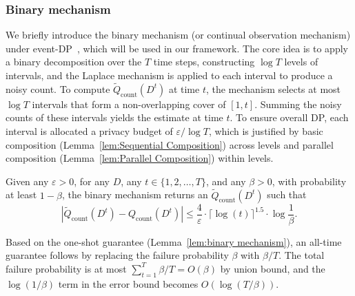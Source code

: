 \subsubsection{Binary mechanism}
\label{sec:Binary mechanism}
We briefly introduce the binary mechanism (or continual observation mechanism) under event-DP~\cite{dwork2010differential, chan2011private}, which will be used in our framework. 
The core idea is to apply a binary decomposition over the $T$ time steps, constructing $\log T$ levels of intervals, and the Laplace mechanism is applied to each interval to produce a noisy count.
To compute $\tilde{Q}_\text{count}(D^t)$ at time $t$, the mechanism selects at most $\log T$ intervals that form a non-overlapping cover of $[1,t]$. 
Summing the noisy counts of these intervals yields the estimate at time $t$.
To ensure overall DP, each interval is allocated a privacy budget of $\varepsilon / \log T$, which is justified by basic composition (Lemma~\ref{lem:Sequential Composition}) across levels and parallel composition (Lemma~\ref{lem:Parallel Composition}) within levels.

\begin{lemma}
\label{lem:binary mechanism}
    Given any $\varepsilon > 0 $, for any $D$, any $t \in \{1,2,\dots,T\}$, and any $\beta> 0$, with probability at least $1 - \beta$, the binary mechanism returns an $\tilde{Q}_\text{count}(D^t)$ such that
    \[
    \left| \tilde{Q}_\text{count}(D^t)-{Q}_\text{count}(D^t) \right| \le \frac{4}{\varepsilon} \cdot \lceil \log(t) \rceil ^ {1.5} \cdot \log \frac{1}{\beta}.
    \]
\end{lemma}


\begin{remark}
    Based on the one-shot guarantee (Lemma~\ref{lem:binary mechanism}), an all-time guarantee follows by replacing the failure probability $\beta$ with $\beta/T$. The total failure probability is at most $\sum_{t=1}^T \beta/T = O(\beta)$ by union bound, and the $\log(1/\beta)$ term in the error bound becomes $O(\log(T/\beta))$.
\end{remark}




